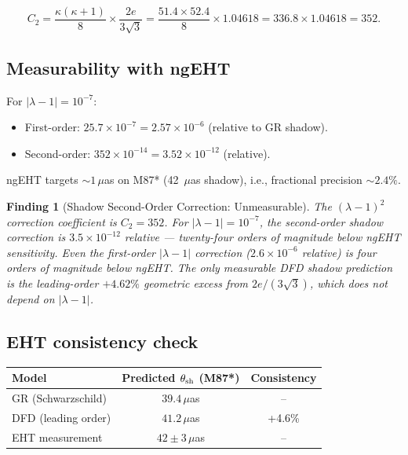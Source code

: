 \documentclass[11pt]{article}
\newtheorem{finding}{Finding}
\newcommand{\ee}[1]{\times 10^{#1}}
\newcommand{\lambdaone}{|\lambda-1|}
\begin{document}
\begin{equation}
  \boxed{C_2 = \frac{\kappa(\kappa+1)}{8}\times\frac{2e}{3\sqrt{3}}
  = \frac{51.4\times 52.4}{8}\times 1.04618
  = 336.8 \times 1.04618 = 352.}
\end{equation}

\subsection{Measurability with ngEHT}

For $\lambdaone = 10^{-7}$:
\begin{itemize}[nosep]
  \item First-order: $25.7\times 10^{-7} = 2.57\ee{-6}$ (relative to GR shadow).
  \item Second-order: $352\times 10^{-14} = 3.52\ee{-12}$ (relative).
\end{itemize}

ngEHT targets $\sim 1\,\mu$as on M87* (42~$\mu$as shadow), i.e.,
fractional precision $\sim 2.4\%$.

\begin{finding}[Shadow Second-Order Correction: Unmeasurable]
The $(\lambda-1)^2$ correction coefficient is $C_2 = 352$.
For $\lambdaone = 10^{-7}$, the second-order shadow correction is
$3.5\ee{-12}$ relative --- twenty-four orders of magnitude below
ngEHT sensitivity.  Even the first-order $\lambdaone$ correction
($2.6\ee{-6}$ relative) is four orders of magnitude below ngEHT.
The \emph{only} measurable DFD shadow prediction is the leading-order
$+4.62\%$ geometric excess from $2e/(3\sqrt{3})$, which does not
depend on $\lambdaone$.
\end{finding}

\subsection{EHT consistency check}

\begin{center}
\begin{tabular}{lcc}
\toprule
Model & Predicted $\theta_{\rm sh}$ (M87*) & Consistency \\
\midrule
GR (Schwarzschild) & $39.4\,\mu$as & -- \\
DFD (leading order) & $41.2\,\mu$as & +4.6\% \\
EHT measurement & $42 \pm 3\,\mu$as & -- \\
\bottomrule
\end{tabular}
\end{center}
\end{document}
